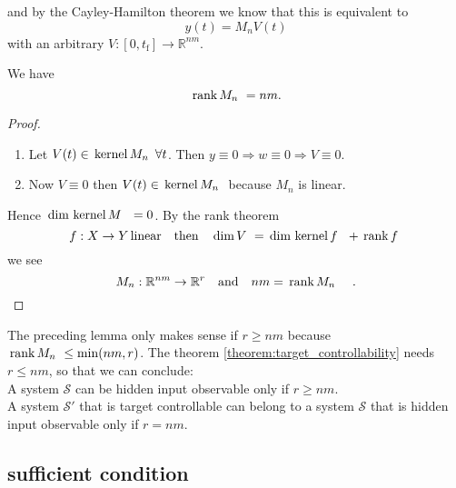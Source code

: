 and by the Cayley-Hamilton theorem we know that 
this is equivalent to
\begin{equation}
y(t) = M_n V(t)
\end{equation}
with an arbitrary $V:[0,t_\text{f}]\to \mathbb{R}^{nm}$. 
\begin{lemma}
We have
\begin{equation}
 \, \text{rank}\,M_n \,\,  = nm .
\end{equation}
\begin{proof}
\begin{enumerate}
\item Let $V(t) \in  \, \text{kernel}\,M_n \,\, \,\forall t$. Then $y \equiv 0 \Rightarrow w\equiv 0 
\Rightarrow V \equiv 0$.
\item Now $V \equiv 0$ then $V(t)\in  \, \text{kernel}\,M_n \,\,$ because $M_n$ is linear.
\end{enumerate}
Hence $ \, \text{dim}\, \, \text{kernel}\,M \,\, \,\, = 0$. By the rank theorem 
\begin{equation}
f:X\to Y \,\text{linear} \quad \text{then} \quad  \, \text{dim}\,V \,\, =  \, \text{dim}\, \, \text{kernel}\,f \,\, \,\, +  \, \text{rank}\,f \,\, 
\end{equation}
we see
\begin{equation}
M_n:\mathbb{R}^{nm}\to\mathbb{R}^r \quad \text{and} \quad nm =  \, \text{rank}\,M_n \,\,  \quad . 
\end{equation}
\end{proof}
\end{lemma}
\begin{remark}
The preceding lemma only makes sense if $r \geq nm$ because $ \, \text{rank}\,M_n \,\, \leq \min(nm,r)$. 
The theorem \ref{theorem:target_controllability} needs $r \leq nm$, so that we can 
conclude: \\

A system $\mathcal{S}$ can be hidden input observable only if $r\geq nm$. \\

A system $\mathcal{S}'$ that is target controllable can belong to a system $\mathcal{S}$ 
that is hidden input observable only if $r = nm$.
\end{remark}


\subsection{sufficient condition}
